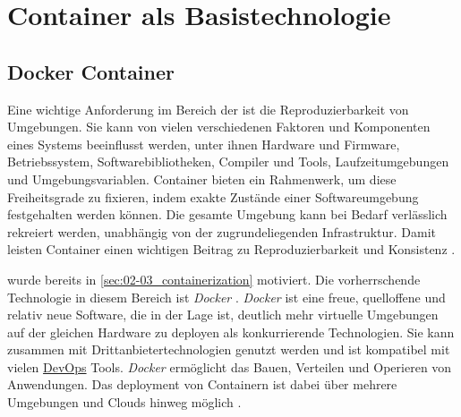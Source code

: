 \section{Container als Basistechnologie}
\label{sec:05-01_containers-as-base-technology}

\subsection{Docker Container}
\label{subsec:05-01-01_docker-container}

Eine wichtige Anforderung im Bereich der  ist die Reproduzierbarkeit von Umgebungen. Sie kann von vielen verschiedenen Faktoren und Komponenten eines Systems beeinflusst werden, unter ihnen Hardware und Firmware, Betriebssystem, Softwarebibliotheken, Compiler und Tools, Laufzeitumgebungen und Umgebungsvariablen. Container bieten ein Rahmenwerk, um diese Freiheitsgrade zu fixieren, indem exakte Zustände einer Softwareumgebung festgehalten werden können. Die gesamte Umgebung kann bei Bedarf verlässlich rekreiert werden, unabhängig von der zugrundeliegenden Infrastruktur. \cite{013:Role-of-Containers-in-Reproducibility} Damit leisten Container einen wichtigen Beitrag zu Reproduzierbarkeit und Konsistenz \cite{013:Role-of-Containers-in-Reproducibility,014:Managing-Container-based-Software-Development-Environments,023:Setting-up-CI-CD-Pipeline-in-the-Cloud-for-Web-Application,024:Investiugating-Impact-of-Containerization-on-Deployment-Process-in-DevOps}.

 wurde bereits in \autoref{sec:02-03_containerization} motiviert. Die vorherrschende Technologie in diesem Bereich ist \textit{Docker} \cite{015:Containers-in-Software-Development,021:Docker-Security-Threat-Model-and-Best-Practices}. \textit{Docker} ist eine freue, quelloffene und relativ neue Software, die in der Lage ist, deutlich mehr virtuelle Umgebungen auf der gleichen Hardware zu deployen als konkurrierende Technologien. Sie kann zusammen mit Drittanbietertechnologien genutzt werden und ist kompatibel mit vielen \hyperref[sec:03-01_devops]{DevOps} Tools. \textit{Docker} ermöglicht das Bauen, Verteilen und Operieren von Anwendungen. \cite{021:Docker-Security-Threat-Model-and-Best-Practices} Das \Gls{deployment} von Containern ist dabei über mehrere Umgebungen und Clouds hinweg möglich \cite{023:Setting-up-CI-CD-Pipeline-in-the-Cloud-for-Web-Application,024:Investiugating-Impact-of-Containerization-on-Deployment-Process-in-DevOps}.

